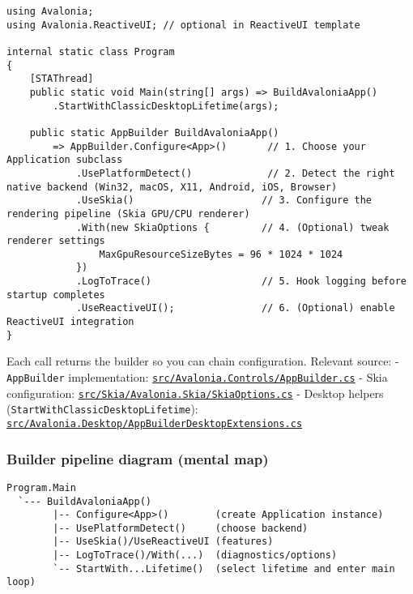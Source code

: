 \begin{lstlisting}
using Avalonia;
using Avalonia.ReactiveUI; // optional in ReactiveUI template

internal static class Program
{
    [STAThread]
    public static void Main(string[] args) => BuildAvaloniaApp()
        .StartWithClassicDesktopLifetime(args);

    public static AppBuilder BuildAvaloniaApp()
        => AppBuilder.Configure<App>()       // 1. Choose your Application subclass
            .UsePlatformDetect()             // 2. Detect the right native backend (Win32, macOS, X11, Android, iOS, Browser)
            .UseSkia()                      // 3. Configure the rendering pipeline (Skia GPU/CPU renderer)
            .With(new SkiaOptions {         // 4. (Optional) tweak renderer settings
                MaxGpuResourceSizeBytes = 96 * 1024 * 1024
            })
            .LogToTrace()                   // 5. Hook logging before startup completes
            .UseReactiveUI();               // 6. (Optional) enable ReactiveUI integration
}
\end{lstlisting}

Each call returns the builder so you can chain configuration. Relevant
source: - \passthrough{\lstinline!AppBuilder!} implementation:
\href{https://github.com/AvaloniaUI/Avalonia/blob/master/src/Avalonia.Controls/AppBuilder.cs}{\passthrough{\lstinline!src/Avalonia.Controls/AppBuilder.cs!}}
- Skia configuration:
\href{https://github.com/AvaloniaUI/Avalonia/blob/master/src/Skia/Avalonia.Skia/SkiaOptions.cs}{\passthrough{\lstinline!src/Skia/Avalonia.Skia/SkiaOptions.cs!}}
- Desktop helpers
(\passthrough{\lstinline!StartWithClassicDesktopLifetime!}):
\href{https://github.com/AvaloniaUI/Avalonia/blob/master/src/Avalonia.Desktop/AppBuilderDesktopExtensions.cs}{\passthrough{\lstinline!src/Avalonia.Desktop/AppBuilderDesktopExtensions.cs!}}

\subsubsection{Builder pipeline diagram (mental
map)}\label{builder-pipeline-diagram-mental-map}

\begin{lstlisting}
Program.Main
  `--- BuildAvaloniaApp()
        |-- Configure<App>()        (create Application instance)
        |-- UsePlatformDetect()     (choose backend)
        |-- UseSkia()/UseReactiveUI (features)
        |-- LogToTrace()/With(...)  (diagnostics/options)
        `-- StartWith...Lifetime()  (select lifetime and enter main loop)
\end{lstlisting}

